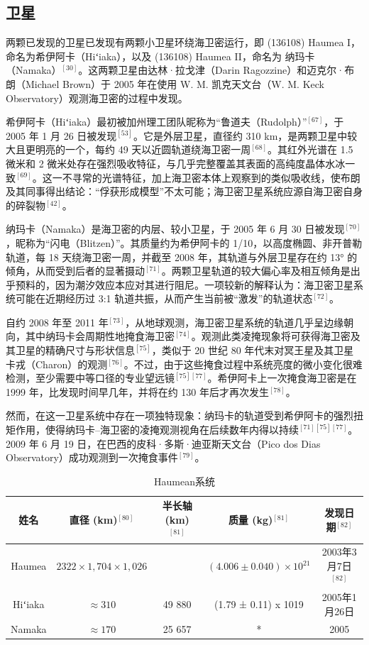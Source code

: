 \subsection{卫星}
两颗已发现的卫星已发现有两颗小卫星环绕海卫密运行，即 (136108) Haumea I，命名为希伊阿卡（Hiʻiaka），以及 (136108) Haumea II，命名为 纳玛卡（Namaka）$^{[30]}$。这两颗卫星由达林·拉戈津（Darin Ragozzine）和迈克尔·布朗（Michael Brown）于 2005 年在使用 W. M. 凯克天文台（W. M. Keck Observatory）观测海卫密的过程中发现。

希伊阿卡（Hiʻiaka）最初被加州理工团队昵称为“鲁道夫（Rudolph）”$^{[67]}$，于 2005 年 1 月 26 日被发现$^{[53]}$。它是外层卫星，直径约 310 km，是两颗卫星中较大且更明亮的一个，每约 49 天以近圆轨道绕海卫密一周$^{[68]}$。其红外光谱在 1.5 微米和 2 微米处存在强烈吸收特征，与几乎完整覆盖其表面的高纯度晶体水冰一致$^{[69]}$。这一不寻常的光谱特征，加上海卫密本体上观察到的类似吸收线，使布朗及其同事得出结论：“俘获形成模型”不太可能；海卫密卫星系统应源自海卫密自身的碎裂物$^{[42]}$。

纳玛卡（Namaka）是海卫密的内层、较小卫星，于 2005 年 6 月 30 日被发现$^{[70]}$，昵称为“闪电（Blitzen）”。其质量约为希伊阿卡的 1/10，以高度椭圆、非开普勒轨道，每 18 天绕海卫密一周，并截至 2008 年，其轨道与外层卫星存在约 13° 的倾角，从而受到后者的显著摄动$^{[71]}$。两颗卫星轨道的较大偏心率及相互倾角是出乎预料的，因为潮汐效应本应对其进行阻尼。一项较新的解释认为：海卫密卫星系统可能在近期经历过 3:1 轨道共振，从而产生当前被“激发”的轨道状态$^{[72]}$。

自约 2008 年至 2011 年$^{[73]}$，从地球观测，海卫密卫星系统的轨道几乎呈边缘朝向，其中纳玛卡会周期性地掩食海卫密$^{[74]}$。观测此类凌掩现象将可获得海卫密及其卫星的精确尺寸与形状信息$^{[75]}$，类似于 20 世纪 80 年代末对冥王星及其卫星卡戎（Charon）的观测$^{[76]}$。不过，由于这些掩食过程中系统亮度的微小变化很难检测，至少需要中等口径的专业望远镜$^{[75][77]}$。希伊阿卡上一次掩食海卫密是在 1999 年，比发现时间早几年，并将在约 130 年后才再次发生$^{[78]}$。

然而，在这一卫星系统中存在一项独特现象：纳玛卡的轨道受到希伊阿卡的强烈扭矩作用，使得纳玛卡–海卫密的凌掩观测视角在后续数年内得以持续$^{[71][75][77]}$。2009 年 6 月 19 日，在巴西的皮科·多斯·迪亚斯天文台（Pico dos Dias Observatory）成功观测到一次掩食事件$^{[79]}$。
\begin{table}[ht]
\centering
\caption{Haumean系统}\label{tab_Haumea1}
\begin{tabular}{|c|c|c|c|c|}
\hline
\textbf{姓名}&\textbf{直径 (km)$^{[80]}$} & \textbf{半长轴 (km)$^{[81]}$} & \textbf{质量 (kg)$^{[81]}$} & \textbf{发现日期$^{[82]}$} \\
\hline
Haumea &  $2 322 \times 1,704 \times 1,026 $ &  &$ (4.006 \pm 0.040) \times 10^{21}$ & 2003年3月7日$^{[82]}$ \\
\hline
Hiʻiaka & $\approx310$ & 49 880 & (1.79 ± 0.11) x 1019 & 2005年1月26日 \\
\hline
Namaka& $\approx170$ & 25 657 & * & 2005 \\
\hline
\end{tabular}
\end{table}
